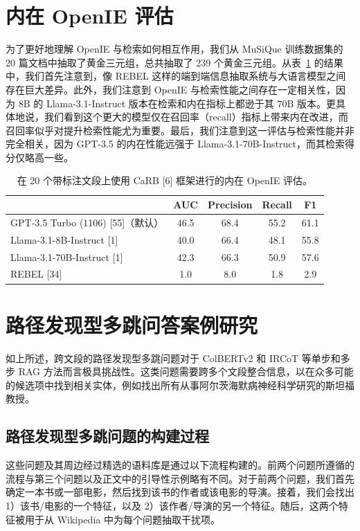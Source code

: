 \documentclass[11pt,UTF8,fontset=fandol]{ctexart}
\begin{document}
\section{内在 OpenIE 评估}

为了更好地理解 OpenIE 与检索如何相互作用，我们从 MuSiQue 训练数据集的 20 篇文档中抽取了黄金三元组，总共抽取了 239 个黄金三元组。从表~\ref{tab:9} 的结果中，我们首先注意到，像 REBEL 这样的端到端信息抽取系统与大语言模型之间存在巨大差异。此外，我们注意到 OpenIE 与检索性能之间存在一定相关性，因为 8B 的 Llama-3.1-Instruct 版本在检索和内在指标上都逊于其 70B 版本。更具体地说，我们看到这个更大的模型仅在召回率（recall）指标上带来内在改进，而召回率似乎对提升检索性能尤为重要。最后，我们注意到这一评估与检索性能并非完全相关，因为 GPT-3.5 的内在性能远强于 Llama-3.1-70B-Instruct，而其检索得分仅略高一些。

\begin{table}[H]\centering
\caption{在 20 个带标注文段上使用 CaRB [6] 框架进行的内在 OpenIE 评估。}
\label{tab:9}
\begin{tabular}{lcccc}
\toprule
 & AUC & Precision & Recall & F1 \\
\midrule
GPT-3.5 Turbo (1106) [55]（默认） & 46.5 & 68.4 & 55.2 & 61.1 \\
Llama-3.1-8B-Instruct [1] & 40.0 & 66.4 & 48.1 & 55.8 \\
Llama-3.1-70B-Instruct [1] & 42.3 & 66.3 & 50.9 & 57.6 \\
REBEL [34] & 1.0 & 8.0 & 1.8 & 2.9 \\
\bottomrule
\end{tabular}
\end{table}

\section{路径发现型多跳问答案例研究}

如上所述，跨文段的路径发现型多跳问题对于 ColBERTv2 和 IRCoT 等单步和多步 RAG 方法而言极具挑战性。这类问题需要跨多个文段整合信息，以在众多可能的候选项中找到相关实体，例如找出所有从事阿尔茨海默病神经科学研究的斯坦福教授。

\subsection{路径发现型多跳问题的构建过程}

这些问题及其周边经过精选的语料库是通过以下流程构建的。前两个问题所遵循的流程与第三个问题以及正文中的引导性示例略有不同。对于前两个问题，我们首先确定一本书或一部电影，然后找到该书的作者或该电影的导演。接着，我们会找出 1）该书/电影的一个特征，以及 2）该作者/导演的另一个特征。随后，这两个特征被用于从 Wikipedia 中为每个问题抽取干扰项。
\end{document}
